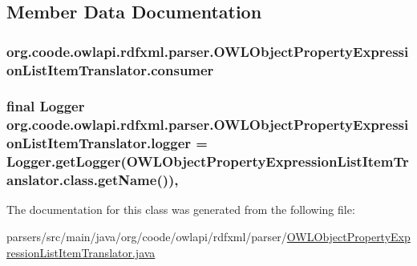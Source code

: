 \subsection{Member Data Documentation}
\hypertarget{classorg_1_1coode_1_1owlapi_1_1rdfxml_1_1parser_1_1_o_w_l_object_property_expression_list_item_translator_af211e5e3c6169df55f5ed609f0222850}{
\subsubsection[{consumer}]{ org.\-coode.\-owlapi.\-rdfxml.\-parser.\-O\-W\-L\-Object\-Property\-Expression\-List\-Item\-Translator.\-consumer\hspace{0.3cm}{\ttfamily [private]}}}\label{classorg_1_1coode_1_1owlapi_1_1rdfxml_1_1parser_1_1_o_w_l_object_property_expression_list_item_translator_af211e5e3c6169df55f5ed609f0222850}
\hypertarget{classorg_1_1coode_1_1owlapi_1_1rdfxml_1_1parser_1_1_o_w_l_object_property_expression_list_item_translator_a3dc74c290af67d85fda9ef34f5920ac5}{
\subsubsection[{logger}]{\setlength{\rightskip}{0pt plus 5cm}final Logger org.\-coode.\-owlapi.\-rdfxml.\-parser.\-O\-W\-L\-Object\-Property\-Expression\-List\-Item\-Translator.\-logger = Logger.\-get\-Logger(O\-W\-L\-Object\-Property\-Expression\-List\-Item\-Translator.\-class.\-get\-Name())\hspace{0.3cm}{\ttfamily [static]}, {\ttfamily [private]}}}\label{classorg_1_1coode_1_1owlapi_1_1rdfxml_1_1parser_1_1_o_w_l_object_property_expression_list_item_translator_a3dc74c290af67d85fda9ef34f5920ac5}


The documentation for this class was generated from the following file\-:\begin{DoxyCompactItemize}
\item 
parsers/src/main/java/org/coode/owlapi/rdfxml/parser/\hyperlink{_o_w_l_object_property_expression_list_item_translator_8java}{O\-W\-L\-Object\-Property\-Expression\-List\-Item\-Translator.\-java}\end{DoxyCompactItemize}
